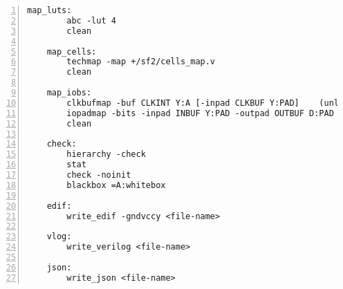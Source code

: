 \begin{lstlisting}[numbers=left,frame=single]
    map_luts:
        abc -lut 4
        clean

    map_cells:
        techmap -map +/sf2/cells_map.v
        clean

    map_iobs:
        clkbufmap -buf CLKINT Y:A [-inpad CLKBUF Y:PAD]    (unless -noiobs, -inpad only passed if -clkbuf)
        iopadmap -bits -inpad INBUF Y:PAD -outpad OUTBUF D:PAD -toutpad TRIBUFF E:D:PAD -tinoutpad BIBUF E:Y:D:PAD    (unless -noiobs
        clean

    check:
        hierarchy -check
        stat
        check -noinit
        blackbox =A:whitebox

    edif:
        write_edif -gndvccy <file-name>

    vlog:
        write_verilog <file-name>

    json:
        write_json <file-name>
\end{lstlisting}


